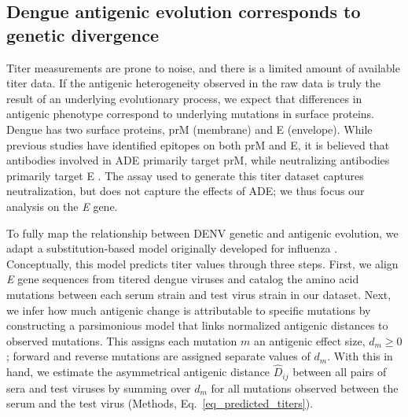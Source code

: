 \documentclass[11pt,oneside,letterpaper]{article}
\begin{document}
\subsection*{Dengue antigenic evolution corresponds to genetic divergence}
Titer measurements are prone to noise, and there is a limited amount of available titer data.
If the antigenic heterogeneity observed in the raw data is truly the result of an underlying evolutionary process, we expect that differences in antigenic phenotype correspond to underlying mutations in surface proteins.
Dengue has two surface proteins, prM (membrane) and E (envelope).
While previous studies have identified epitopes on both prM and E, it is believed that antibodies involved in ADE primarily target prM, while neutralizing antibodies primarily target E \citep{de2014dengue}.
The assay used to generate this titer dataset captures neutralization, but does not capture the effects of ADE; we thus focus our analysis on the \textit{E} gene.

To fully map the relationship between DENV genetic and antigenic evolution, we adapt a substitution-based model originally developed for influenza \citep{neher2016prediction}.
Conceptually, this model predicts titer values through three steps.
First, we align \textit{E} gene sequences from titered dengue viruses and catalog the amino acid mutations between each serum strain and test virus strain in our dataset.
Next, we infer how much antigenic change is attributable to specific mutations by constructing a parsimonious model that links normalized antigenic distances to observed mutations.
This assigns each mutation $m$ an antigenic effect size, $d_m \geq 0$; forward and reverse mutations are assigned separate values of $d_m$.
With this in hand, we estimate the asymmetrical antigenic distance $\hat{D}_{ij}$ between all pairs of sera and test viruses by summing over $d_m$ for all mutations observed between the serum and the test virus (Methods, Eq.~\ref{eq_predicted_titers}).
\end{document}
